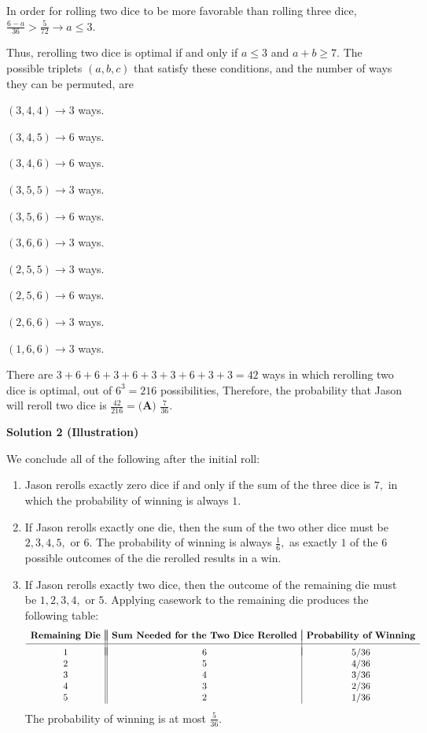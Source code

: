\begin{enumerate}
 In order for rolling two dice to be more favorable than rolling three dice, $\frac{6 - a}{36} > \frac5{72} \rightarrow a \leq 3$.

 Thus, rerolling two dice is optimal if and only if $a \leq 3$ and $a + b \geq 7$. The possible triplets $(a, b, c)$ that satisfy these conditions, and the number of ways they can be permuted, are

 $(3, 4, 4) \rightarrow 3$ ways.

 $(3, 4, 5) \rightarrow 6$ ways.

 $(3, 4, 6) \rightarrow 6$ ways.

 $(3, 5, 5) \rightarrow 3$ ways.

 $(3, 5, 6) \rightarrow 6$ ways.

 $(3, 6, 6) \rightarrow 3$ ways.

 $(2, 5, 5) \rightarrow 3$ ways.

 $(2, 5, 6) \rightarrow 6$ ways.

 $(2, 6, 6) \rightarrow 3$ ways.

 $(1, 6, 6) \rightarrow 3$ ways.

 There are $3 + 6 + 6 + 3 + 6 + 3 + 3 + 6 + 3 + 3 = 42$ ways in which rerolling two dice is optimal, out of $6^3 = 216$ possibilities, Therefore, the probability that Jason will reroll two dice is $\frac{42}{216} = \boxed{\textbf{(A) } \frac{7}{36}}$.

 



\textbf{Solution 2 (Illustration)}

We conclude all of the following after the initial roll:

 
            \begin{enumerate} 
        \item Jason rerolls exactly zero dice if and only if the sum of the three dice is $7,$ in which the probability of winning is always $1.$

        \item If Jason rerolls exactly one die, then the sum of the two other dice must be $2,3,4,5,$ or $6.$ The probability of winning is always $\frac16,$ as exactly $1$ of the $6$ possible outcomes of the die rerolled results in a win. 

        \item If Jason rerolls exactly two dice, then the outcome of the remaining die must be $1,2,3,4,$ or $5.$ Applying casework to the remaining die produces the following table:
 \[\begin{array}{c||c|c} & & \\ [-2.5ex] \textbf{Remaining Die} & \textbf{Sum Needed for the Two Dice Rerolled} & \textbf{Probability of Winning} \\ [0.5ex] \hline & & \\ [-2ex] 1 & 6 & 5/36 \\ 2 & 5 & 4/36 \\ 3 & 4 & 3/36 \\ 4 & 3 & 2/36 \\ 5 & 2 & 1/36 \end{array}\]The probability of winning is at most $\frac{5}{36}.$


\end{enumerate}
\end{enumerate}
